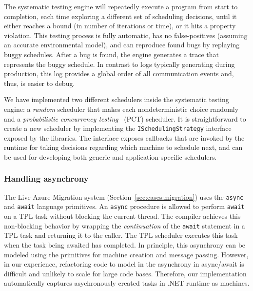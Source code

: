 The \psharp systematic testing engine will repeatedly execute a program from start to completion, each time exploring a different set of scheduling decisions, until it either reaches a bound (in number of iterations or time), or it hits a property violation. This testing process is fully automatic, has no false-positives (assuming an accurate environmental model), and can reproduce found bugs by replaying buggy schedules. After a bug is found, the engine generates a trace that represents the buggy schedule. In contrast to logs typically generating during production, this log provides a global order of all communication events and, thus, is easier to debug.

We have implemented two different schedulers inside the \psharp systematic testing engine: a \emph{random} scheduler that makes each nondeterministic choice randomly and a \emph{probabilistic concurrency testing}~\cite{burckhardt2010pct} (PCT) scheduler. It is straightforward to create a new scheduler by implementing the \texttt{ISchedulingStrategy} interface~\cite{desai2015systematic} exposed by the \psharp libraries. The interface exposes callbacks that are invoked by the \psharp runtime for taking decisions regarding which machine to schedule next, and can be used for developing both generic and application-specific schedulers.

\subsubsection{Handling  asynchrony}
\label{sec:psharp:async}

The Live Azure Migration system (Section~\ref{sec:cases:migration}) uses the \texttt{async} and \texttt{await}  language primitives.
An \texttt{async} procedure is allowed to perform \texttt{await} on a TPL task without blocking the current thread.
The \csharp compiler achieves this non-blocking behavior by wrapping the \emph{continuation} of the \texttt{await} statement
in a TPL task and returning it to the caller.
The TPL scheduler executes this task when the task being awaited has completed.
In principle, this asynchrony can be modeled using the \psharp primitives for machine creation and message passing.
However, in our experience, refactoring code to model in \psharp the asynchrony in async/await is difficult and unlikely
to scale for large code bases.
Therefore, our implementation automatically captures asychronously created tasks in .NET runtime as \psharp machines.

